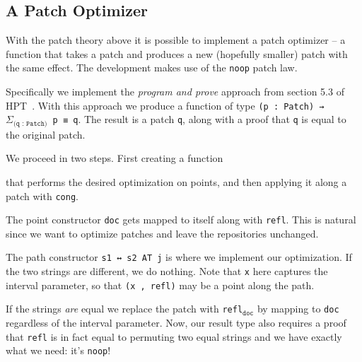 \subsection{A Patch Optimizer}\label{subsec/opt}

With the patch theory above it is possible to implement a patch optimizer --
a function that takes a patch and produces a new (hopefully smaller) patch
with the same effect. The development makes use of the \texttt{noop} patch law.

Specifically we implement the \emph{program and prove} approach from section 5.3 of HPT~\cite{Angiuli2016}.
With this approach we produce a function of type \texttt{(p : Patch) → $\Sigma_\texttt{(q : Patch)}$ p ≡ q}.
The result is a patch \texttt{q}, along with a proof that \texttt{q} is equal to the original patch.

We proceed in two steps. First creating a function
\begin{code}%
\>[0]\AgdaSpace{}%
\AgdaSymbol{:}\AgdaSpace{}%
\AgdaSymbol{(}\AgdaSpace{}%
\AgdaSymbol{:}\AgdaSpace{}%
\AgdaSymbol{)}\AgdaSpace{}%
\AgdaSpace{}%
\AgdaFunction{Σ[}\AgdaSpace{}%
\AgdaSpace{}%
\AgdaSpace{}%
\AgdaSpace{}%
\AgdaFunction{]}\AgdaSpace{}%
\AgdaSpace{}%
\AgdaSpace{}%
\<%
\end{code}
that performs the desired optimization on points, and then applying it along
a patch with \texttt{cong}.

The point constructor \texttt{doc} gets mapped to itself along with \texttt{refl}.
This is natural since we want to optimize patches and leave the repositories unchanged.
\begin{code}%
\>[0]\AgdaSpace{}%
\AgdaSpace{}%
\AgdaSymbol{=}\AgdaSpace{}%
\AgdaSymbol{(}\AgdaSpace{}%
\AgdaOperator{\AgdaInductiveConstructor{,}}\AgdaSpace{}%
\AgdaSymbol{)}\<%
\end{code}
The path constructor \texttt{s1 ↔ s2 AT j} is where we implement our optimization.
If the two strings are different, we do nothing. Note that \texttt{x} here captures the
interval parameter, so that \texttt{(x , refl)} may be a point along the path.

If the strings \emph{are} equal we replace the patch with \texttt{refl$_\texttt{doc}$} by
mapping to \texttt{doc} regardless of the interval parameter. Now, our result type also requires
a proof that \texttt{refl} is in fact equal to permuting two equal strings and we have exactly
what we need: it's \texttt{noop}!

